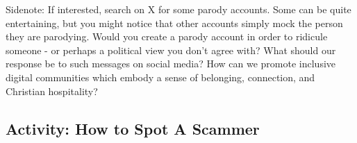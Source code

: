 \documentclass[
]{book}
\theoremstyle{definition}
\theoremstyle{definition}
\theoremstyle{definition}
\theoremstyle{definition}
\theoremstyle{remark}
\begin{document}
\begin{feedback}
Sidenote: If interested, search on X for some parody accounts. Some can
be quite entertaining, but you might notice that other accounts simply
mock the person they are parodying. Would you create a parody account in
order to ridicule someone - or perhaps a political view you don't agree
with? What should our response be to such messages on social media? How
can we promote inclusive digital communities which embody a sense of
belonging, connection, and Christian hospitality?
\end{feedback}

\hypertarget{activity-how-to-spot-a-scammer}{%
\subsection*{Activity: How to Spot A Scammer}\label{activity-how-to-spot-a-scammer}}
\end{document}
